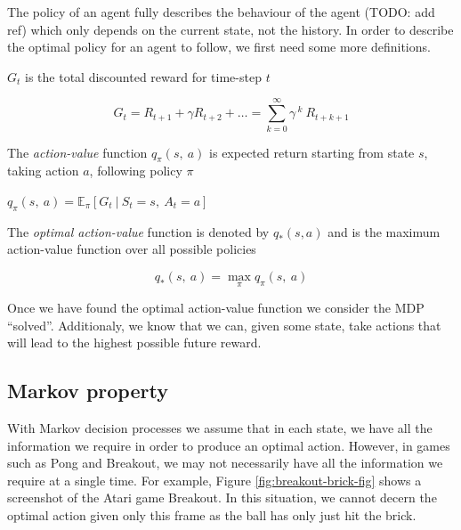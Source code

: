 The policy of an agent fully describes the behaviour of the agent (TODO: add ref) which only depends on the current state, not the history. In order to describe the optimal policy for an agent to follow, we first need some more definitions.

\begin{defn}
	$G_t$ is the total discounted reward for time-step $t$
	\vspace*{-7mm}
	\begin{center}
		$$G_t = R_{t+1} + \gamma R_{t+2} + \dots = \sum_{k=0}^{\infty}\gamma^{~k}~R_{t+k+1}$$
	\end{center}
\end{defn}

\begin{defn}
	The \textit{action-value} function $q_\pi(s,~a)$ is expected return starting from state $s$, taking action $a$, following policy $\pi$
	\begin{center}
		$q_\pi(s,~a)=\mathbb{E}_\pi[G_t~|~S_t=s,~A_t=a]$
	\end{center}
\end{defn}

\begin{defn}
	The \textit{optimal action-value} function is denoted by $q_*(s, a)$ and is the maximum action-value function over all possible policies
	\vspace*{-7mm}
	\begin{center}
		$$q_*(s,~a)=\max_\pi q_\pi(s,~a)$$
	\end{center}
\end{defn}

Once we have found the optimal action-value function we consider the MDP ``solved''. Additionaly, we know that we can, given some state, take actions that will lead to the highest possible future reward.

\subsection{Markov property}
With Markov decision processes we assume that in each state, we have all the information we require in order to produce an optimal action. However, in games such as Pong and Breakout, we may not necessarily have all the information we require at a single time. For example, Figure \ref{fig:breakout-brick-fig} shows a screenshot of the Atari game Breakout. In this situation, we cannot decern the optimal action given only this frame as the ball has only just hit the brick.

